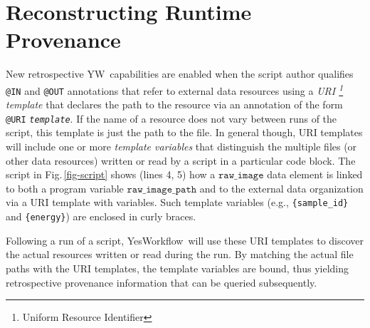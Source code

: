 \documentclass[letterpaper,twocolumn,10pt]{article}
\newcommand{\figref}[1]{Fig.\,\ref{#1}}
\newcommand{\code}[1]{\ensuremath{\mathtt{#1}}}
\newcommand{\YW}{\textsf{YesWorkflow}}
\newcommand{\yw}{\textsf{YW}}
\newcommand{\ywa}[1]{\texttt{#1}}
\begin{document}
\section{Reconstructing Runtime Provenance}
\label{sec:reconstr-retr-prov}

New retrospective \yw\ capabilities are enabled when the script author
qualifies \ywa{@IN} and \ywa{@OUT} annotations that refer to external
data resources using a \emph{URI \footnote{Uniform Resource
    Identifier} template} that declares the path to the resource via
an annotation of the form
\ywa{@URI}\,\textvisiblespace\,\ywa{\emph{template}}.  If the name of
a resource does not vary between runs of the script, this template is
just the path to the file.  In general though, URI templates will
include one or more \emph{template variables} that distinguish the
multiple files (or other data resources) written or read by a script
in a particular code block.  The script in \figref{fig-script} shows
(lines 4, 5) how a \code{raw\_image} data element is linked to both a
program variable \code{raw\_image\_path} and to the external data
organization via a URI template with variables. Such template variables (e.g.,
\verb|{sample_id}| and \verb|{energy}|) are enclosed in curly braces.





Following a run of a script, \YW\ will use these URI templates to
discover the actual resources written or read during the run.  By
matching the actual file paths with the URI templates, the template
variables are bound, thus yielding retrospective provenance
information that can be queried subsequently.


\end{document}

